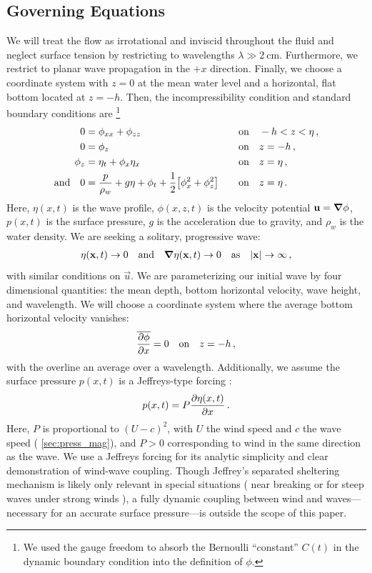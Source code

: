\documentclass{jfm}
\begin{document}
\subsection{Governing Equations}
We will treat the flow as irrotational and inviscid throughout the
fluid and neglect surface tension by restricting to wavelengths $\lambda
\gg \SI{2}{\centi\meter}$.
Furthermore, we restrict to planar wave propagation in the $+x$
direction.
Finally, we choose a coordinate system with $z=0$ at the mean water level and
a horizontal, flat bottom located at $z=-h$.
Then, the incompressibility condition and standard boundary conditions
are%
\footnote{
  We used the gauge freedom to absorb the Bernoulli ``constant'' $C(t)$
  in the dynamic boundary condition into the definition of $\phi$.
}
\begin{alignat}{2}
  0 &= \phi_{xx} + \phi_{zz} &&\qq{on}
  -h < z < \eta \,, \label{eq:laplace}\\
  0 &= \phi_{z} &&\qq{on} z=-h \,, \label{eq:bottom_bc}\\
  \phi_{z} &= \eta_{t} + \phi_{x} \eta_{x} &&\qq{on} z = \eta \,,
  \label{eq:kinematic_bc}\\
  \qq*{and} 0 &= \frac{p}{\rho_w} + g\eta + \phi_{t} +
  \frac{1}{2} \bqty{\phi_{x}^2 + \phi_{z}^2} &&\qq{on} z=
  \eta \,. \label{eq:dynamic_bc}
\end{alignat}
Here, $\eta(x,t)$ is the wave profile, $\phi(x,z,t)$ is the velocity
potential $\mathbf{\bm{u}} = \grad{\phi}$, $p(x,t)$ is the surface pressure,
$g$ is the acceleration due to gravity, and $\rho_w$ is the water
density.
We are seeking a solitary, progressive wave:
\begin{gather}
  \eta(\vec{x},t) \to 0 \qq{and} \grad{\eta(\vec{x},t)} \to 0 \qq{as}
  \abs{\vec{x}} \to \infty \,,
\end{gather}
with similar conditions on $\vec{u}$.
We are parameterizing our initial wave by four dimensional quantities:
the mean depth, bottom horizontal velocity, wave height, and wavelength.
We will choose a coordinate system where the average bottom horizontal
velocity vanishes:
\begin{equation}
  \overline{ \pdv{\phi}{x} } = 0 \qq{on} z=-h \,,
  \label{eq:bot_bc_horz}
\end{equation}
with the overline an average over a wavelength.
Additionally, we assume the surface pressure $p(x,t)$ is a Jeffreys-type
forcing \citep{jeffreys1925formation}:
\begin{equation}
  p(x,t) = P \pdv{\eta(x,t)}{x} \,.
\end{equation}
Here, $P$ is proportional to $(U-c)^2$, with $U$ the wind speed and $c$
the wave speed (\cf{} \cref{sec:press_mag}), and $P>0$ corresponding to
wind in the same direction as the wave.
We use a Jeffreys forcing for its analytic simplicity and clear
demonstration of wind-wave coupling.
Though Jeffrey's separated sheltering mechanism is likely only relevant
in special situations (\eg{} near breaking
\citealp{banner1976separation} or for steep waves under strong winds
\citealp{tian2013evolution,touboul2006interaction}),
a fully dynamic coupling between wind and waves---necessary for an
accurate surface pressure---is outside the scope of this paper.
\end{document}
